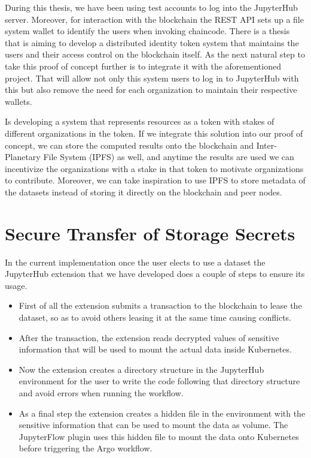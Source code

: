 \bigskip
During this thesis, we have been using test accounts to log into the JupyterHub server. Moreover, for interaction with the blockchain the REST API sets up a file system wallet to identify the users when invoking chaincode. There is a thesis that is aiming to develop a distributed identity token system that maintains the users and their access control on the blockchain itself. As the next natural step to take this proof of concept further is to integrate it with the aforementioned project. That will allow not only this system users to log in to JupyterHub with this but also remove the need for each organization to maintain their respective wallets.

\bigskip
\cite{nft-thesis} Is developing a system that represents resources as a token with stakes of different organizations in the token. If we integrate this solution into our proof of concept, we can store the computed results onto the blockchain and Inter-Planetary File System (IPFS) as well, and anytime the results are used we can incentivize the organizations with a stake in that token to motivate organizations to contribute. Moreover, we can take inspiration to use IPFS to store metadata of the datasets instead of storing it directly on the blockchain and peer nodes.

\section{Secure Transfer of Storage Secrets}
In the current implementation once the user elects to use a dataset the JupyterHub extension that we have developed does a couple of steps to ensure its usage.
\begin{itemize}
    \item First of all the extension submits a transaction to the blockchain to lease the dataset, so as to avoid others leasing it at the same time causing conflicts.
    \item After the transaction, the extension reads decrypted values of sensitive information that will be used to mount the actual data inside Kubernetes.
    \item Now the extension creates a directory structure in the JupyterHub environment for the user to write the code following that directory structure and avoid errors when running the workflow.
    \item As a final step the extension creates a hidden file in the environment with the sensitive information that can be used to mount the data as volume. The JupyterFlow plugin uses this hidden file to mount the data onto Kubernetes before triggering the Argo workflow.
\end{itemize}


